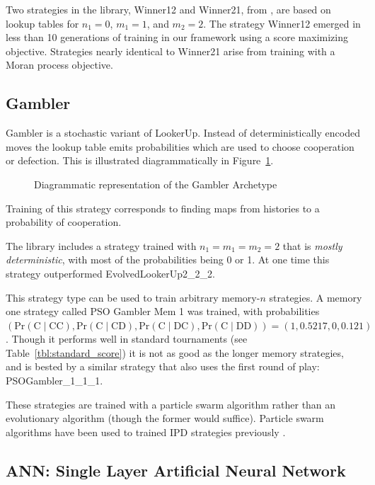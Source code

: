 \documentclass{article}
\begin{document}
Two strategies in the library, Winner12 and Winner21, from \cite{Mathieu2015},
are based on lookup tables for $n_1 = 0$, $m_1 = 1$, and $m_2=2$. The strategy
Winner12 emerged in less than 10 generations of training in our framework using
a score maximizing objective. Strategies nearly identical to Winner21 arise
from training with a Moran process objective.

\subsection{Gambler}\label{sec:gambler}

Gambler is a stochastic variant of LookerUp. Instead of deterministically
encoded moves the lookup table emits probabilities which are
used to choose cooperation or defection.
This is illustrated diagrammatically in Figure~\ref{fig:gambler}.

\begin{figure}[!hbtp]
    \centering
    
    \caption{Diagrammatic representation of the Gambler Archetype}
    \label{fig:gambler}
\end{figure}

Training of this strategy corresponds to finding maps from histories to
a probability of cooperation.

The library includes a strategy trained
with $n_1 = m_1 = m_2 = 2$ that is \emph{mostly deterministic}, with most of the
probabilities being 0 or 1. At one time this strategy outperformed
EvolvedLookerUp2\_2\_2.

This strategy type can be used to train arbitrary memory-$n$ strategies. A
memory one strategy called PSO Gambler Mem 1 was trained, with
probabilities $(\text{Pr}(\text{C}\;|\;\text{CC}),
                \text{Pr}(\text{C}\;|\;\text{CD}),
                \text{Pr}(\text{C}\;|\;\text{DC}),
                \text{Pr}(\text{C}\;|\;\text{DD})) = (1, 0.5217, 0, 0.121)$.
Though it performs well in standard tournaments (see
Table~\ref{tbl:standard_score})
it is not as good as the longer memory strategies, and is bested by a similar
strategy that also uses the first round of play: PSOGambler\_1\_1\_1.

These strategies are trained with a particle swarm algorithm rather than an
evolutionary algorithm (though the former would suffice). Particle swarm
algorithms have been used to trained IPD strategies previously
\cite{franken2005particle}.

\subsection{ANN: Single Layer Artificial Neural Network}
\end{document}
